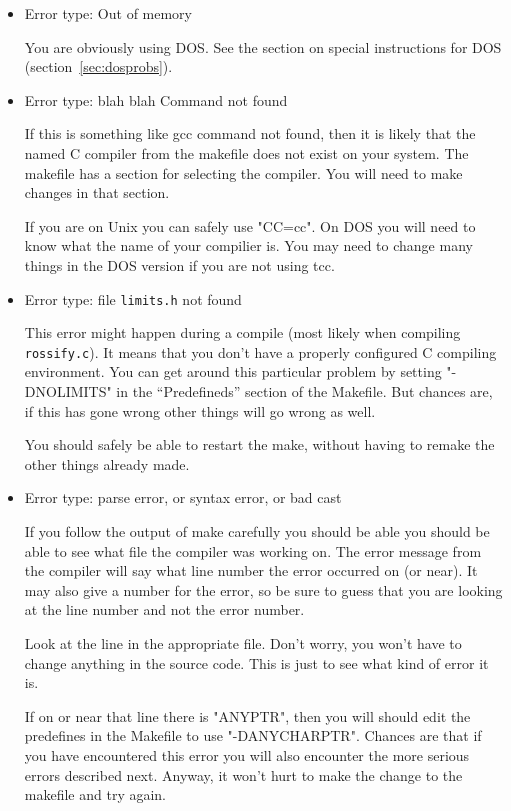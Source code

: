 \documentclass[%
	11pt,
        a4paper,
        twoside]{workrep}
\newcommand*{\file}[1]{\texttt{#1}}		%
\begin{document}
\begin{itemize}
\item Error type:   Out of memory

    You are obviously using DOS.  See the section on special
    instructions for DOS (section~\ref{sec:dosprobs}).

\item Error type:  blah blah Command not found
    
    If this is something like gcc command not found, then it is likely
    that the named C compiler from the makefile does not exist on
    your system.  The makefile has a section for selecting the compiler.
    You will need to make changes in that section.
    
    If you are on Unix you can safely use "CC=cc".  On DOS you will
    need to know what the name of your compilier is.  You may need to
    change many things in the DOS version if you are not using tcc.   
	
\item Error type:  file \file{limits.h} not found

    This error might happen during a compile (most likely when
    compiling \file{rossify.c}).  It means that you don't have
    a properly configured C compiling environment.  You can get around
    this particular problem by setting "-DNOLIMITS" in the ``Predefineds''
    section of the Makefile.  But chances are, if this has gone wrong
    other things will go wrong as well.

    You should safely be able to restart the make, without having
    to remake the other things already made.

\item Error type:  parse error, or syntax error, or bad cast

    If you follow the output of make carefully you should be able
    you should be able to see what file the compiler was working
    on.  The error message from the compiler will say what line
    number the error occurred on (or near).  It may also give
    a number for the error, so be sure to guess that you are looking
    at the line number and not the error number.

    Look at the line in the appropriate file.  Don't worry, you won't
    have to change anything in the source code.  This is just to see
    what kind of error it is.

    If on or near that line there is "ANYPTR", then you will should
    edit the predefines in the Makefile to use "-DANYCHARPTR".  Chances
    are that if you have encountered this error you will also encounter
    the more serious errors described next.  Anyway, it won't hurt to make
    the change to the makefile and try again.


\end{itemize}
\end{document}
